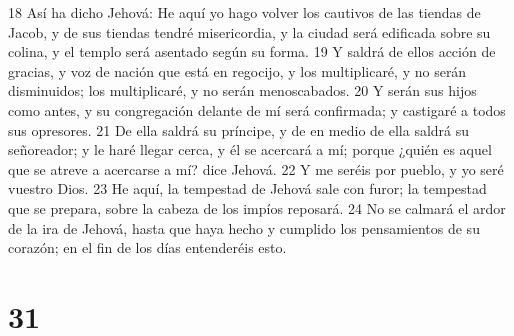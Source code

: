 18 Así ha dicho Jehová: He aquí yo hago volver los cautivos de las tiendas de Jacob, y de sus tiendas tendré misericordia, y la ciudad será edificada sobre su colina, y el templo será asentado según su forma.
19 Y saldrá de ellos acción de gracias, y voz de nación que está en regocijo, y los multiplicaré, y no serán disminuidos; los multiplicaré, y no serán menoscabados.
20 Y serán sus hijos como antes, y su congregación delante de mí será confirmada; y castigaré a todos sus opresores.
21 De ella saldrá su príncipe, y de en medio de ella saldrá su señoreador; y le haré llegar cerca, y él se acercará a mí; porque ¿quién es aquel que se atreve a acercarse a mí? dice Jehová.
22 Y me seréis por pueblo, y yo seré vuestro Dios.
23 He aquí, la tempestad de Jehová sale con furor; la tempestad que se prepara, sobre la cabeza de los impíos reposará.
24 No se calmará el ardor de la ira de Jehová, hasta que haya hecho y cumplido los pensamientos de su corazón; en el fin de los días entenderéis esto.

\chapter{31}

